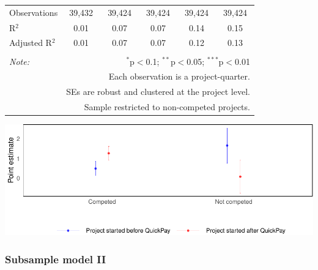 \documentclass[
]{article}
\begin{document}
\begin{table}[H]
\begin{tabular}{@{\extracolsep{-2pt}}lccccc}
Observations & 39,432 & 39,424 & 39,424 & 39,424 & 39,424 \\ 
R$^{2}$ & 0.01 & 0.07 & 0.07 & 0.14 & 0.15 \\ 
Adjusted R$^{2}$ & 0.01 & 0.07 & 0.07 & 0.12 & 0.13 \\ 
\hline 
\hline \\[-1.8ex] 
\textit{Note:}  & \multicolumn{5}{r}{$^{*}$p$<$0.1; $^{**}$p$<$0.05; $^{***}$p$<$0.01} \\ 
 & \multicolumn{5}{r}{Each observation is a project-quarter.} \\ 
 & \multicolumn{5}{r}{SEs are robust and clustered at the project level.} \\ 
 & \multicolumn{5}{r}{Sample restricted to non-competed projects.} \\ 
\end{tabular} 
\end{table}

\includegraphics{qp_first_pc_delay-2_files/figure-latex/subsample_plot-1.pdf}

\hypertarget{subsample-model-ii}{%
\subsubsection{Subsample model II}\label{subsample-model-ii}}
\end{document}
